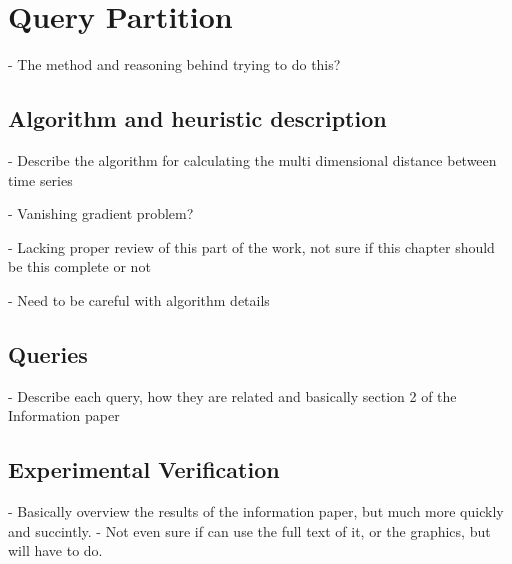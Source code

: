 
\chapter{Query Partition}\label{ch:querypart}

- The method and reasoning behind trying to do this?

\section{Algorithm and heuristic description}\label{ch:querypart:heur}

- Describe the algorithm for calculating the multi dimensional distance between time series

- Vanishing gradient problem?

- Lacking proper review of this part of the work, not sure if this chapter should be this complete or not

- Need to be careful with algorithm details

\section{Queries}\label{ch:querypart:queries}

- Describe each query, how they are related and basically section 2 of the Information paper

\section{Experimental Verification}\label{ch:querypart:exp}

- Basically overview the results of the information paper, but much more quickly and succintly.
- Not even sure if can use the full text of it, or the graphics, but will have to do.
